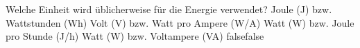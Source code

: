     {Welche Einheit wird üblicherweise für die Energie verwendet?}
    {Joule (J) bzw. Wattstunden (Wh)}
    {Volt (V) bzw. Watt pro Ampere (W/A)}
    {Watt (W) bzw. Joule pro Stunde (J/h)}
    {Watt (W) bzw. Voltampere (VA)}
    {false}{false}